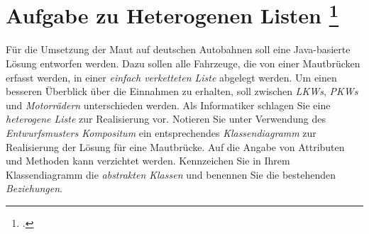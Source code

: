\documentclass{lehramt-informatik-aufgabe}
\begin{document}

\section{Aufgabe zu Heterogenen Listen
\footcite[Seite 1, Aufgabe 1: Heterogene Liste]{aud:pu:4}}

Für die Umsetzung der Maut auf deutschen Autobahnen soll eine
Java-basierte Lösung entworfen werden. Dazu sollen alle Fahrzeuge, die
von einer Mautbrücken erfasst werden, in einer \emph{einfach verketteten
Liste} abgelegt werden. Um einen besseren Überblick über die Einnahmen
zu erhalten, soll zwischen \emph{LKWs}, \emph{PKWs} und
\emph{Motorrädern} unterschieden werden. Als Informatiker schlagen Sie
eine \emph{heterogene Liste} zur Realisierung vor. Notieren Sie unter
Verwendung des \emph{Entwurfsmusters Kompositum} ein entsprechendes
\emph{Klassendiagramm} zur Realisierung der Lösung für eine Mautbrücke.
Auf die Angabe von Attributen und Methoden kann verzichtet werden.
Kennzeichen Sie in Ihrem Klassendiagramm die \emph{abstrakten Klassen}
und benennen Sie die bestehenden \emph{Beziehungen}.

\begin{center}
\end{center}
\end{document}
